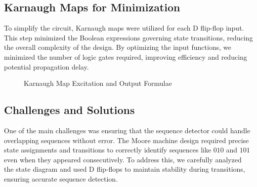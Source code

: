 \documentclass[12pt]{article}
\begin{document}
\subsection*{Karnaugh Maps for Minimization}
To simplify the circuit, Karnaugh maps were utilized for each D flip-flop input. This step minimized the Boolean expressions governing state transitions, reducing the overall complexity of the design. By optimizing the input functions, we minimized the number of logic gates required, improving efficiency and reducing potential propagation delay.
\begin{figure}[H]
 \hspace{2cm}

\hspace{2cm}

\caption{Karnaugh Map Excitation and Output Formulae}
\end{figure}

\subsection*{Challenges and Solutions}
One of the main challenges was ensuring that the sequence detector could handle overlapping sequences without error. The Moore machine design required precise state assignments and transitions to correctly identify sequences like \( 010 \) and \( 101 \) even when they appeared consecutively. To address this, we carefully analyzed the state diagram and used D flip-flops to maintain stability during transitions, ensuring accurate sequence detection.
\end{document}
